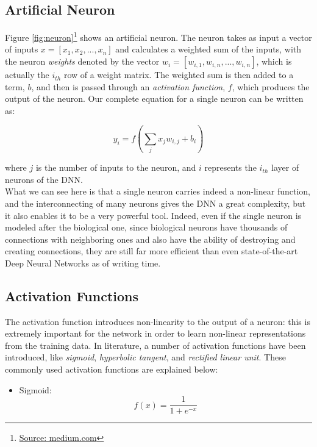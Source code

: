 \subsection{Artificial Neuron}
Figure \ref{fig:neuron}\footnote{\href{https://medium.com/@jayeshbahire/the-artificial-neural-networks-handbook-part-4-d2087d1f583e}{Source: medium.com}} shows an artificial neuron. The neuron takes as input a vector of inputs $x = [x_1, x_2, ..., x_n]$ and calculates a weighted sum of the inputs, with the neuron \textit{weights} denoted by the vector $w_i = [w_{i,1}, w_{i,n}, ..., w_{i,n}]$, which is actually the $i_{th}$ row of a weight matrix. The weighted sum is then added to a  term, $b$, and then is passed through an \textit{activation function}, $f$, which produces the output of the neuron. Our  complete equation for a single neuron can be written as:


\begin{equation}
	\label{eq:neuron}
	y_i = f(\sum_{j} x_j w_{i,j} + b_i)
\end{equation}

where $j$ is the number of inputs to the neuron, and $i$ represents the $i_{th}$ layer of neurons of the DNN.
\\
\indent What we can see here is that a single neuron carries indeed a non-linear function, and the interconnecting of many neurons gives the DNN a great complexity, but it also enables it to be a very powerful tool. Indeed, even if the single neuron is modeled after the biological one, since biological neurons have thousands of connections with neighboring ones and also have the ability of destroying and creating connections, they are still far more efficient than even state-of-the-art Deep Neural Networks as of writing time.

\subsection{Activation Functions}
\label{subsec:ActivationFunctions}
The activation function introduces non-linearity to the output of a neuron: this is extremely important for the network in order to learn non-linear representations from the training data. In literature, a number of activation functions have been introduced, like \textit{sigmoid}, \textit{hyperbolic tangent}, and \textit{rectified linear unit}. These commonly used activation functions are explained below:

\begin{itemize}
	\item Sigmoid: 
	\begin{equation}
		f(x) = \dfrac{1}{1 + e^{-x}}	\end{equation}
\end{itemize} 

